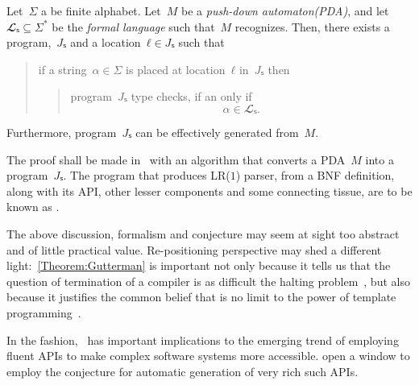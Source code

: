 \begin{Theorem}
\label{Theorem:Gil-Levy}
Let~$Σ$ a be finite alphabet.
Let~$M$ be a \emph{push-down automaton(PDA)}, and let~$𝓛ₛ⊆Σ^*$ be
the \emph{formal language} such that~$M$ recognizes.
Then, there exists a \Java program,~$Jₛ$ and a location~$ℓ∈Jₛ$
such that
\begin{quote}
  if a string~$α∈Σ$ is
  placed at location~$ℓ$ in~$Jₛ$ then
  \begin{quote}
    program~$Jₛ$ type checks, if an only if
    \[
      α∈𝓛ₛ.
    \]
  \end{quote}
\end{quote}
Furthermore, program~$Jₛ$ can be effectively generated from~$M$.
\end{Theorem}

The proof shall be made in~ with an algorithm that converts a
  PDA~$M$ into a program~$Jₛ$.
The program that produces LR($1$) parser, from a BNF definition,
  along with its API, other lesser components and
  some connecting tissue, are to be known as \Self.

The above discussion, formalism and conjecture may seem at sight too abstract
  and of little practical value.
Re-positioning perspective may shed a different light:~\cref{Theorem:Gutterman} is important not only because it tells us
  that the question of termination of a \CC compiler is as difficult
  the halting problem~\cite{Turing:1936}, but also because it
  justifies the common belief that is no limit to the power of
  template programming~\cite{Musser:Stepanov:1989,Dehnert:Stepanov:2000
  ,Backhouse:Jansson:1999, Austern:1998,Bracha:Odersky:1998,Garcia:Jarvi:2003}.

In the fashion,~ has important
  implications to the emerging trend of employing fluent APIs
  to make complex software systems more accessible.
\Self open a window to employ the conjecture for
  automatic generation of very rich such APIs.
